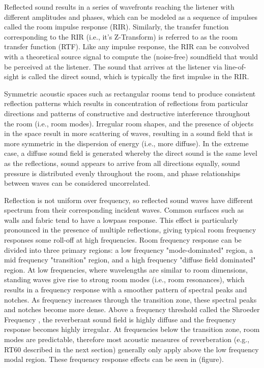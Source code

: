 Reflected sound results in a series of wavefronts reaching the listener with different amplitudes and phases, which can be modeled as a sequence of impulses called the room impulse response (RIR). Similarly, the transfer function corresponding to the RIR (i.e., it's Z-Transform) is referred to as the room transfer function (RTF). Like any impulse response, the RIR can be convolved with a theoretical source signal to compute the (noise-free) soundfield that would be perceived at the listener. The sound that arrives at the listener via line-of-sight is called the direct sound, which is typically the first impulse in the RIR.

Symmetric acoustic spaces such as rectangular rooms tend to produce consistent reflection patterns which results in concentration of reflections from particular directions and patterns of constructive and destructive interference throughout the room (i.e., room modes). Irregular room shapes, and the presence of objects in the space result in more scattering of waves, resulting in a sound field that is more symmetric in the dispersion of energy (i.e., more diffuse). In the extreme case, a diffuse sound field is generated whereby the direct sound is the same level as the reflections, sound appears to arrive from all directions equally, sound pressure is distributed evenly throughout the room, and phase relationships between waves can be considered uncorrelated.

Reflection is not uniform over frequency, so reflected sound waves have different spectrum from their corresponding incident waves. Common surfaces such as walls and fabric tend to have a lowpass response. This effect is particularly pronounced in the presence of multiple reflections, giving typical room frequency responses some roll-off at high frequencies. Room frequency response can be divided into three primary regions: a low frequency "mode-dominated" region, a mid frequency "transition" region, and a high frequency "diffuse field dominated" region. At low frequencies, where wavelengths are similar to room dimensions, standing waves give rise to strong room modes (i.e., room resonances), which results in a frequency response with a smoother pattern of spectral peaks and notches. As frequency increases through the transition zone, these spectral peaks and notches become more dense. Above a frequency threshold called the Shroeder Frequency \citep{schroeder1962frequency}, the reverberant sound field is highly diffuse and the frequency response becomes highly irregular. At frequencies below the transition zone, room modes are predictable, therefore most acoustic measures of reverberation (e.g., RT60 described in the next section) generally only apply above the low frequency modal region. These frequency response effects can be seen in (figure).

